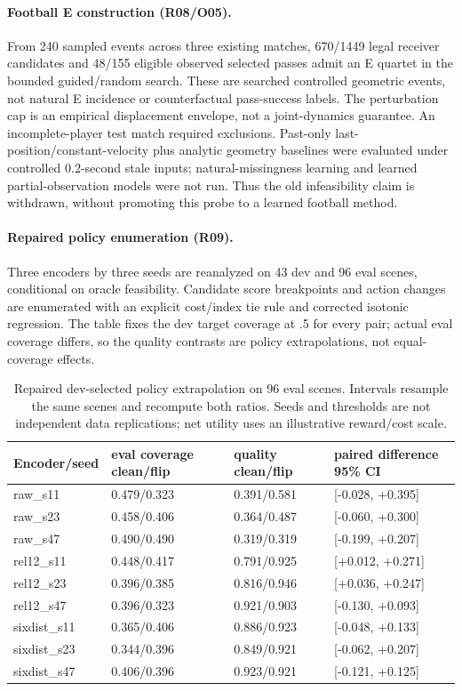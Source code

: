 \paragraph{Football E construction (R08/O05).} From 240 sampled events across three existing matches, 670/1449 legal receiver candidates and 48/155 eligible observed selected passes admit an E quartet in the bounded guided/random search. These are searched controlled geometric events, not natural E incidence or counterfactual pass-success labels. The perturbation cap is an empirical displacement envelope, not a joint-dynamics guarantee. An incomplete-player test match required exclusions. Past-only last-position/constant-velocity plus analytic geometry baselines were evaluated under controlled 0.2-second stale inputs; natural-missingness learning and learned partial-observation models were not run. Thus the old infeasibility claim is withdrawn, without promoting this probe to a learned football method.
\paragraph{Repaired policy enumeration (R09).} Three encoders by three seeds are reanalyzed on 43 dev and 96 eval scenes, conditional on oracle feasibility. Candidate score breakpoints and action changes are enumerated with an explicit cost/index tie rule and corrected isotonic regression. The table fixes the dev target coverage at .5 for every pair; actual eval coverage differs, so the quality contrasts are policy extrapolations, not equal-coverage effects.
\begin{table}[t]\centering\small\begin{tabular}{@{}llll@{}}\toprule
Encoder/seed & eval coverage clean/flip & quality clean/flip & paired difference 95\% CI \\
\midrule
raw\_s11 & 0.479/0.323 & 0.391/0.581 & [-0.028, +0.395] \\
raw\_s23 & 0.458/0.406 & 0.364/0.487 & [-0.060, +0.300] \\
raw\_s47 & 0.490/0.490 & 0.319/0.319 & [-0.199, +0.207] \\
rel12\_s11 & 0.448/0.417 & 0.791/0.925 & [+0.012, +0.271] \\
rel12\_s23 & 0.396/0.385 & 0.816/0.946 & [+0.036, +0.247] \\
rel12\_s47 & 0.396/0.323 & 0.921/0.903 & [-0.130, +0.093] \\
sixdist\_s11 & 0.365/0.406 & 0.886/0.923 & [-0.048, +0.133] \\
sixdist\_s23 & 0.344/0.396 & 0.849/0.921 & [-0.062, +0.207] \\
sixdist\_s47 & 0.406/0.396 & 0.923/0.921 & [-0.121, +0.125] \\
\bottomrule\end{tabular}\caption{Repaired dev-selected policy extrapolation on 96 eval scenes. Intervals resample the same scenes and recompute both ratios. Seeds and thresholds are not independent data replications; net utility uses an illustrative reward/cost scale.}\end{table}
